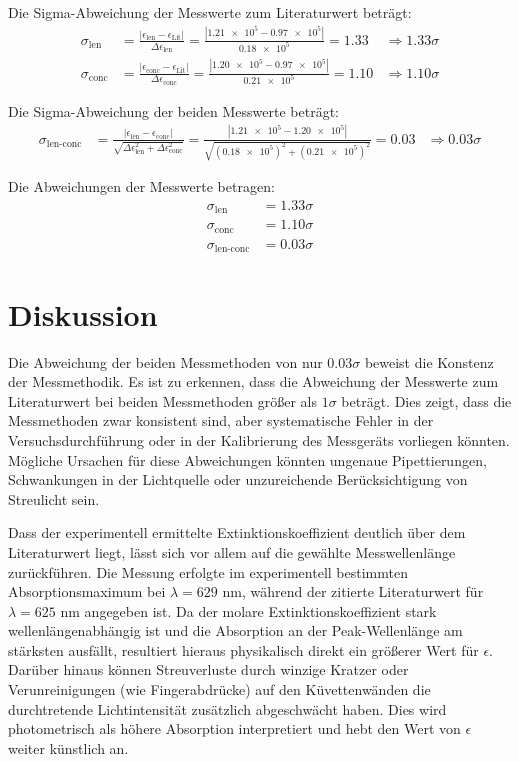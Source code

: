 \documentclass[12pt,a4paper,titlepage]{scrartcl}
\numberwithin{equation}{section}
\numberwithin{table}{section}
\numberwithin{figure}{section}
\begin{document}
Die Sigma-Abweichung der Messwerte zum Literaturwert beträgt:
\begin{align}
    \sigma_\text{len} &= \frac{|\epsilon_\text{len} - \epsilon_\text{Lit}|}{\Delta \epsilon_\text{len}} = \frac{|\num{1.21e5} - \num{0.97e5}|}{\num{0.18e5}} = 1.33 &\Rightarrow 1.33\sigma\\
    \sigma_\text{conc} &= \frac{|\epsilon_\text{conc} - \epsilon_\text{Lit}|}{\Delta \epsilon_\text{conc}} = \frac{|\num{1.20e5} - \num{0.97e5}|}{\num{0.21e5}} = 1.10 &\Rightarrow 1.10\sigma
\end{align}

Die Sigma-Abweichung der beiden Messwerte beträgt:
\begin{align}
    \sigma_\text{len-conc} &= \frac{|\epsilon_\text{len} - \epsilon_\text{conc}|}{\sqrt{\Delta \epsilon_\text{len}^2 + \Delta \epsilon_\text{conc}^2}} = \frac{|\num{1.21e5} - \num{1.20e5}|}{\sqrt{\left(\num{0.18e5}\right)^2 + \left(\num{0.21e5}\right)^2}} = 0.03 &\Rightarrow 0.03\sigma
\end{align}

\begin{resultbox}
    Die Abweichungen der Messwerte betragen:
    \begin{align*}
        \sigma_\text{len} &= 1.33\sigma\\
        \sigma_\text{conc} &= 1.10\sigma\\
        \sigma_\text{len-conc} &= 0.03\sigma
    \end{align*}
\end{resultbox}

\section{Diskussion}

Die Abweichung der beiden Messmethoden von nur $0.03\sigma$ beweist die Konstenz der Messmethodik. Es ist zu erkennen, dass die Abweichung der Messwerte zum Literaturwert bei beiden Messmethoden größer als $1\sigma$ beträgt. Dies zeigt, dass die Messmethoden zwar konsistent sind, aber systematische Fehler in der Versuchsdurchführung oder in der Kalibrierung des Messgeräts vorliegen könnten. Mögliche Ursachen für diese Abweichungen könnten ungenaue Pipettierungen, Schwankungen in der Lichtquelle oder unzureichende Berücksichtigung von Streulicht sein.

Dass der experimentell ermittelte Extinktionskoeffizient deutlich über dem Literaturwert liegt, lässt sich vor allem auf die gewählte Messwellenlänge zurückführen. Die Messung erfolgte im experimentell bestimmten Absorptionsmaximum bei $\lambda = 629\text{ nm}$, während der zitierte Literaturwert für $\lambda = 625\text{ nm}$ angegeben ist. Da der molare Extinktionskoeffizient stark wellenlängenabhängig ist und die Absorption an der Peak-Wellenlänge am stärksten ausfällt, resultiert hieraus physikalisch direkt ein größerer Wert für $\epsilon$. Darüber hinaus können Streuverluste durch winzige Kratzer oder Verunreinigungen (wie Fingerabdrücke) auf den Küvettenwänden die durchtretende Lichtintensität zusätzlich abgeschwächt haben. Dies wird photometrisch als höhere Absorption interpretiert und hebt den Wert von $\epsilon$ weiter künstlich an.
\end{document}
